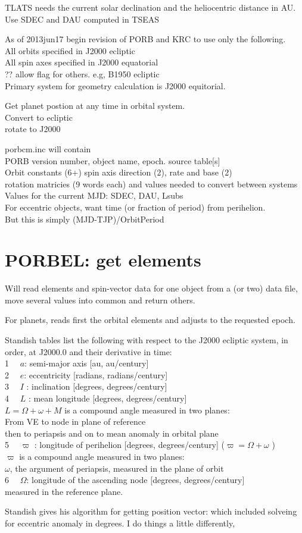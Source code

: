 \documentclass[draft]{article}
\newcommand{\qi}{\\ \hspace*{2.em}}      %
\newcommand{\qii}{\\ \hspace*{4.em}}     %
\newcommand{\qiii}{\\ \hspace*{6.em}}    %
\begin{document}
TLATS needs the current solar declination and the heliocentric distance in AU.
\qi Use SDEC and DAU computed in TSEAS 

As of 2013jun17 begin revision of PORB and KRC to use only the following.
\qi All orbits specified in J2000 ecliptic
\qi All spin axes specified in J2000 equatorial
\qii ?? allow flag for others. e.g, B1950 ecliptic
\qi Primary system for geometry calculation is J2000 equitorial.

Get planet postion at any time in orbital system.
\qi Convert to ecliptic
\qi rotate to J2000 

porbcm.inc will contain
\qi PORB version number, object name, epoch. source table[s]
\qi Orbit constants (6+) spin axis direction (2), rate and base (2)
\qi rotation matricies (9 words each) and values needed to convert between systems
\qi Values for the current MJD: SDEC, DAU, Lsubs
\qi For eccentric objects, want time (or fraction of period) from perihelion.
\qii But this is simply (MJD-TJP)/OrbitPeriod

\section{PORBEL: get elements} %
Will read elements and spin-vector data for one object from a (or two) data file, move several values into common and return others.

For planets, reads first the orbital elements and adjusts to the requested epoch. 

Standish tables list the following with respect to the J2000 ecliptic system, in order, at J2000.0 and their derivative in time:
\qi 1 \ \ $a$: semi-major axis [au, au/century]
\qi 2 \ \ $e$: eccentricity [radians, radians/century]
\qi 3 \ \ $I$ : inclination [degrees, degrees/century]
\qi 4 \ \ $L$ : mean longitude [degrees, degrees/century]
\qii   $L=\Omega +\omega + M$  is a compound angle measured in two planes: 
\qiii From VE to node in plane of reference
\qiii then to periapsis and on to mean anomaly in orbital plane
\qi 5 \ \ $\varpi$ : longitude of perihelion [degrees, degrees/century] ($\varpi= \Omega+ \omega    $ ) 
\qii   $\varpi$ is a compound angle measured in two planes:
\qiii $\omega$, the argument of periapsis, measured in the plane of orbit 
\qi 6 \ \ $\Omega$:  longitude of the ascending node [degrees, degrees/century]
\qii  measured in the reference plane.


Standish gives his algorithm for getting position vector: which included solveing for eccentric anomaly in degrees. I do things a little differently, 
\end{document}
